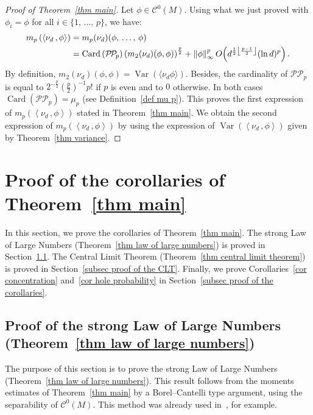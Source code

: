 \documentclass[AHL,Unicode,longabstracts,published]{cedram}
\DeclareMathOperator{\card}{Card}
\DeclareMathOperator{\Var}{Var}
\DeclarePairedDelimiter{\floor}{\lfloor}{\rfloor}
\newcommand{\clC}{\mathcal{C}}
\newcommand{\pp}{\mathcal{P\!P}\!}
\newcommand{\Norm}[1]{\left\lVert #1 \right\rVert}
\newcommand{\prsc}[2]{\left\langle #1\,, #2 \right\rangle}
\newcommand{\var}[1]{\Var\!\left(#1 \right)}
\begin{document}
\begin{proof}[{Proof of Theorem~\ref{thm main}}]
Let $\phi \in \clC^0(M)$. Using what we just proved with $\phi_i=\phi$ for all $i \in \{1,\,\dots,\,p\}$, we have:
\begin{align*}
m_p\left(\prsc{\nu_d}{\phi}\right) &= m_p(\nu_d)(\phi,\,\dots,\,\phi)\\
&= \card\left(\pp_p\right) \left(m_2(\nu_d)(\phi,\phi)\right)^\frac{p}{2} + \Norm{\phi}_\infty^p O\!\left(d^{\frac{1}{2}\floor*{\frac{p-1}{2}}}(\ln d)^p\right).
\end{align*}
By definition, $m_2(\nu_d)(\phi,\phi)=\Var(\langle\nu_d{\phi}\rangle)$. Besides, the cardinality of $\pp_p$ is equal to $2^{-\frac{p}{2}}(\tfrac{p}{2})^{-1}p!$ if $p$ is even and to $0$ otherwise. In both cases $\card(\pp_p)=\mu_p$ (see Definition~\ref{def mu p}). This proves the first expression of $m_p(\prsc{\nu_d}{\phi})$ stated in Theorem~\ref{thm main}. We obtain the second expression of $m_p(\prsc{\nu_d}{\phi})$ by using the expression of $\var{\prsc{\nu_d}{\phi}}$ given by Theorem~\ref{thm variance}.
\end{proof}



\section{Proof of the corollaries of Theorem~\ref{thm main}}\label{sec proof of the corollaries}

In this section, we prove the corollaries of Theorem~\ref{thm main}. The strong Law of Large Numbers (Theorem~\ref{thm law of large numbers}) is proved in Section~\ref{subsec proof of the LLN}. The Central Limit Theorem (Theorem~\ref{thm central limit theorem}) is proved in Section~\ref{subsec proof of the CLT}. Finally, we prove Corollaries~\ref{cor concentration} and~\ref{cor hole probability} in Section~\ref{subsec proof of the corollaries}.



\subsection{Proof of the strong Law of Large Numbers (Theorem~\ref{thm law of large numbers})}\label{subsec proof of the LLN}

The purpose of this section is to prove the strong Law of Large Numbers (Theorem~\ref{thm law of large numbers}). This result follows from the moments estimates of Theorem~\ref{thm main} by a Borel--Cantelli type argument, using the separability of $\clC^0(M)$. This method was already used in~\cite{Let2019,LP2019,SZ1999}, for example.
\end{document}
